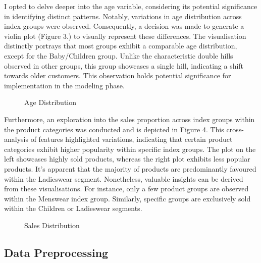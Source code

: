 \documentclass[conference,compsoc]{IEEEtran}
\begin{document}
I opted to delve deeper into the age variable, considering its potential significance in identifying distinct patterns. Notably, variations in age distribution across index groups were observed. Consequently, a decision was made to generate a violin plot (Figure 3.) to visually represent these differences. The visualisation distinctly portrays that most groups exhibit a comparable age distribution, except for the Baby/Children group. Unlike the characteristic double hills observed in other groups, this group showcases a single hill, indicating a shift towards older customers. This observation holds potential significance for implementation in the modeling phase.

\begin{figure}[htbp]
    \centering
    \caption{Age Distribution}
    \label{fig:example}
\end{figure}

Furthermore, an exploration into the sales proportion across index groups within the product categories was conducted and is depicted in Figure 4. This cross-analysis of features highlighted variations, indicating that certain product categories exhibit higher popularity within specific index groups. The plot on the left showcases highly sold products, whereas the right plot exhibits less popular products. It's apparent that the majority of products are predominantly favoured within the Ladieswear segment. Nonetheless, valuable insights can be derived from these visualisations. For instance, only a few product groups are observed within the Menswear index group. Similarly, specific groups are exclusively sold within the Children or Ladieswear segments.

\begin{figure}[htbp]
    \centering
    \caption{Sales Distribution}
    \label{fig:example}
\end{figure}

\subsection{Data Preprocessing}
\end{document}
